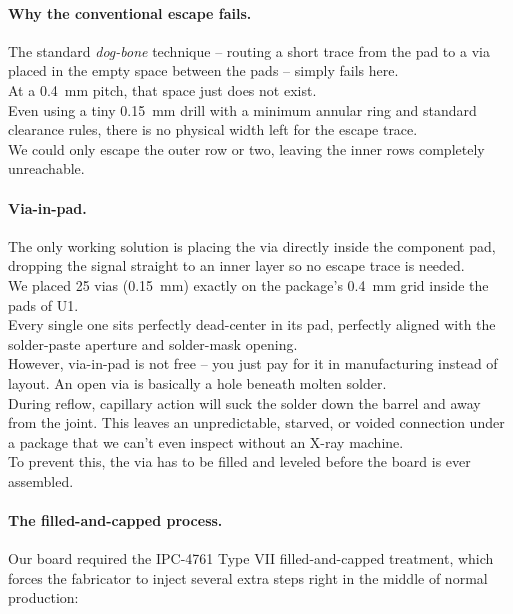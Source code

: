 \documentclass[12pt, a4paper]{article}
\begin{document}
\paragraph{Why the conventional escape fails.} The standard \emph{dog-bone} technique -- routing a short trace from the pad to a via placed in the empty space between the pads -- simply fails here. \\
At a \SI{0.4}{\milli\metre} pitch, that space just does not exist. \\
Even using a tiny \SI{0.15}{\milli\metre} drill with a minimum annular ring and standard clearance rules, there is no physical width left for the escape trace. \\
We could only escape the outer row or two, leaving the inner rows completely unreachable.

\paragraph{Via-in-pad.} The only working solution is placing the via directly inside the component pad, dropping the signal straight to an inner layer so no escape trace is needed. \\
We placed 25 vias (\SI{0.15}{\milli\metre}) exactly on the package's \SI{0.4}{\milli\metre} grid inside the pads of U1. \\
Every single one sits perfectly dead-center in its pad, perfectly aligned with the solder-paste aperture and solder-mask opening. \\
However, via-in-pad is not free -- you just pay for it in manufacturing instead of layout. An open via is basically a hole beneath molten solder. \\
During reflow, capillary action will suck the solder down the barrel and away from the joint. This leaves an unpredictable, starved, or voided connection under a package that we can't even inspect without an X-ray machine. \\
To prevent this, the via has to be filled and leveled before the board is ever assembled.

\paragraph{The filled-and-capped process.} Our board required the IPC-4761 Type VII filled-and-capped treatment, which forces the fabricator to inject several extra steps right in the middle of normal production:
\end{document}

